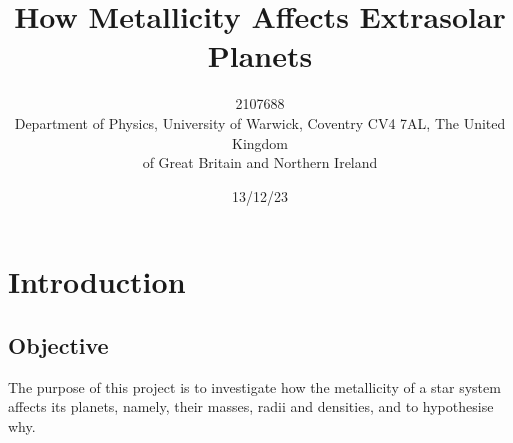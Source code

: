 \documentclass[a4paper,twocolumn,12pt]{article}
\begin{document}
\title{How Metallicity Affects Extrasolar Planets}

\author{2107688 \\
        \small
        Department of Physics, University of Warwick,
        Coventry CV4 7AL, The United Kingdom \\ \small of Great Britain and Northern Ireland}
\date{13/12/23}



\section{Introduction}
\label{section: Introduction}
\subsection{Objective}
\label{subsection: Objective}
The purpose of this project is to investigate how the metallicity of a star system affects its planets, namely, their masses, radii and densities, and to hypothesise why.


\end{document}
